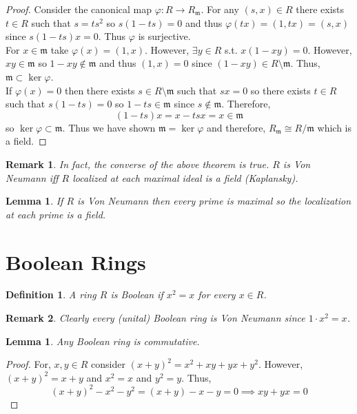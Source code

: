 \documentclass{article}
\newcommand{\m}{\mathfrak{m}}
\theoremstyle{plain}
\newtheorem{defn}{Definition}
\newtheorem{rmk}{Remark}
\newtheorem{prop}{Lemma}
\newtheorem{cor}{Lemma}
\begin{document}
\begin{proof}
Consider the canonical map $\varphi : R \to R_\m$. For any $(s, x) \in R$ there exists $t \in R$ such that $s = ts^2$ so $s(1 - ts) = 0$ and thus $\varphi(tx) = (1, tx) = (s, x)$ since $s(1 - ts)x = 0$. Thus $\varphi$ is surjective. 
\bigskip\\
For $x \in \m$ take $\varphi(x) = (1, x)$. However, $\exists y \in R$ s.t. $x(1 - xy) = 0$. However, $xy \in \m$ so $1 - xy \notin \m$ and thus $(1, x) = 0$ since $(1 - xy) \in R \setminus \m$. Thus, $\m \subset \ker{\varphi}$.
\bigskip\\
If $\varphi(x) = 0$ then there exists $s \in R \setminus \m$ such that $sx = 0$ so there exists $t \in R$ such that $s(1 - ts) = 0$ so $1 - ts \in \m$ since $s \notin \m$. Therefore,
\[ (1 - ts) x = x - tsx = x \in \m \]
so $\ker{\varphi} \subset \m$. Thus we have shown $\m = \ker{\varphi}$ and therefore, $R_\m \cong R / \m$ which is a field. 
\end{proof}

\begin{rmk}
In fact, the converse of the above theorem is true. $R$ is Von Neumann iff $R$ localized at each maximal ideal is a field (Kaplansky). 
\end{rmk}

\begin{cor}
If $R$ is Von Neumann then every prime is maximal so the localization at each prime is a field.
\end{cor}


\section{Boolean Rings}

\begin{defn}
A ring $R$ is \textit{Boolean} if $x^2 = x$ for every $x \in R$. 
\end{defn}

\begin{rmk}
Clearly every (unital) Boolean ring is Von Neumann since $1 \cdot x^2 = x$. 
\end{rmk}

\begin{prop}
Any Boolean ring is commutative.
\end{prop}

\begin{proof}
For, $x, y \in R$ consider $(x + y)^2 = x^2 + xy + yx + y^2$. However, $(x + y)^2 = x + y$ and $x^2 = x$ and $y^2 = y$. Thus,
\[ (x + y)^2 - x^2 - y^2 = (x + y) - x - y = 0 \implies xy + yx = 0 \]
\end{proof}
\end{document}
